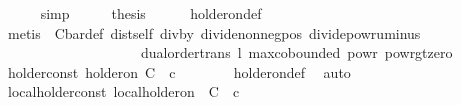 \begin{isabellebody}
\ \ \ \ \isamarkupfalse%
\ simp\isanewline
\ \ \isamarkupfalse%
\ \isamarkupfalse%
\ {\isacharquery}{\kern0pt}thesis\isanewline
\ \ \ \ \isamarkupfalse%
\ holder{\isacharunderscore}{\kern0pt}on{\isacharunderscore}{\kern0pt}def\isanewline
\ \ \ \ \isamarkupfalse%
\ {\isacharparenleft}{\kern0pt}metis\ {\isachardoublequoteopen}{\isacharasterisk}{\kern0pt}{\isachardoublequoteclose}{\isacharparenleft}{\kern0pt}{}{\isacharparenright}{\kern0pt}\ C{\isacharunderscore}{\kern0pt}bar{\isacharunderscore}{\kern0pt}def\ dist{\isacharunderscore}{\kern0pt}self\ div{\isacharunderscore}{\kern0pt}by{\isacharunderscore}{\kern0pt}{}\ divide{\isacharunderscore}{\kern0pt}nonneg{\isacharunderscore}{\kern0pt}pos\ divide{\isacharunderscore}{\kern0pt}powr{\isacharunderscore}{\kern0pt}uminus\ \isanewline
\ \ \ \ \ \ \ \ \ \ \ \ \ \ \ \ \ \ \ \ dual{\isacharunderscore}{\kern0pt}order{\isachardot}{\kern0pt}trans\ l\ max{\isachardot}{\kern0pt}cobounded{}\ powr{\isacharunderscore}{\kern0pt}{}\ powr{\isacharunderscore}{\kern0pt}gt{\isacharunderscore}{\kern0pt}zero{\isacharparenright}{\kern0pt}\isanewline
{}\isamarkupfalse%
%
\endisatagproof
{\isafoldproof}%
%
\isadelimproof
%
\endisadelimproof
\isanewline
\isanewline
{}\isamarkupfalse%
\ holder{\isacharunderscore}{\kern0pt}const{\isacharcolon}{\kern0pt}\ {\isachardoublequoteopen}{\isasymgamma}{\isacharminus}{\kern0pt}holder{\isacharunderscore}{\kern0pt}on\ C\ {\isacharparenleft}{\kern0pt}{\isasymlambda}{\isacharunderscore}{\kern0pt}{\isachardot}{\kern0pt}\ c{\isacharparenright}{\kern0pt}\ {\isasymlongleftrightarrow}\ {\isasymgamma}\ {\isasymin}\ {\isacharbraceleft}{\kern0pt}{}{\isacharless}{\kern0pt}{\isachardot}{\kern0pt}{\isachardot}{\kern0pt}{}{\isacharbraceright}{\kern0pt}{\isachardoublequoteclose}\isanewline
%
\isadelimproof
\ \ %
\endisadelimproof
%
\isatagproof
{}\isamarkupfalse%
\ holder{\isacharunderscore}{\kern0pt}on{\isacharunderscore}{\kern0pt}def\ \isamarkupfalse%
\ auto%
\endisatagproof
{\isafoldproof}%
%
\isadelimproof
\isanewline
%
\endisadelimproof
\isanewline
{}\isamarkupfalse%
\ local{\isacharunderscore}{\kern0pt}holder{\isacharunderscore}{\kern0pt}const{\isacharcolon}{\kern0pt}\ {\isachardoublequoteopen}local{\isacharunderscore}{\kern0pt}holder{\isacharunderscore}{\kern0pt}on\ {\isasymgamma}\ C\ {\isacharparenleft}{\kern0pt}{\isasymlambda}{\isacharunderscore}{\kern0pt}{\isachardot}{\kern0pt}\ c{\isacharparenright}{\kern0pt}\ {\isasymlongleftrightarrow}\ {\isasymgamma}\ {\isasymin}\ {\isacharbraceleft}{\kern0pt}{}{\isacharless}{\kern0pt}{\isachardot}{\kern0pt}{\isachardot}{\kern0pt}{}{\isacharbraceright}{\kern0pt}{\isachardoublequoteclose}\isanewline

\end{isabellebody}

